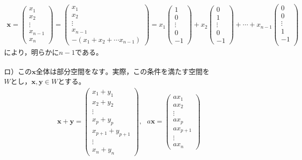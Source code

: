 \documentclass[dvipdfmx,uplatex,11pt]{jsarticle}
\begin{document}
\begin{eqnarray*}
\bm{x}=
\begin{pmatrix}
x_1 \\
x_2 \\
\vdots \\
x_{n-1} \\
x_n
\end{pmatrix}
=
\begin{pmatrix}
x_1 \\
x_2 \\
\vdots \\
x_{n-1} \\
-(x_1+x_2+\cdots x_{n-1})
\end{pmatrix}
=
x_1
\begin{pmatrix}
1 \\
0 \\
\vdots \\
0 \\
-1
\end{pmatrix}
+x_2
\begin{pmatrix}
0 \\
1 \\
\vdots \\
0 \\
-1
\end{pmatrix}
+\cdots +x_{n-1}
\begin{pmatrix}
0 \\
0 \\
\vdots \\
1 \\
-1\\
\end{pmatrix}
\end{eqnarray*}
により，明らかに$n-1$である。\\
\dotfill \\
ロ）この$\bm{x}全体は部分空間をなす。$実際，この条件を満たす空間を$Wとし，\bm{x,y} \in W$とする。
\begin{eqnarray*}
\bm{x}+\bm{y}=
\begin{pmatrix}
x_1+y_1 \\
x_2+y_2 \\
\vdots \\
x_{p}+y_{p} \\
x_{p+1}+y_{p+1} \\
\vdots \\
x_n+y_n
\end{pmatrix}
,~~~
a\bm{x}=
\begin{pmatrix}
ax_1 \\
ax_2 \\
\vdots \\
ax_{p} \\
ax_{p+1} \\
\vdots \\
ax_n
\end{pmatrix}
\end{eqnarray*}
\end{document}
